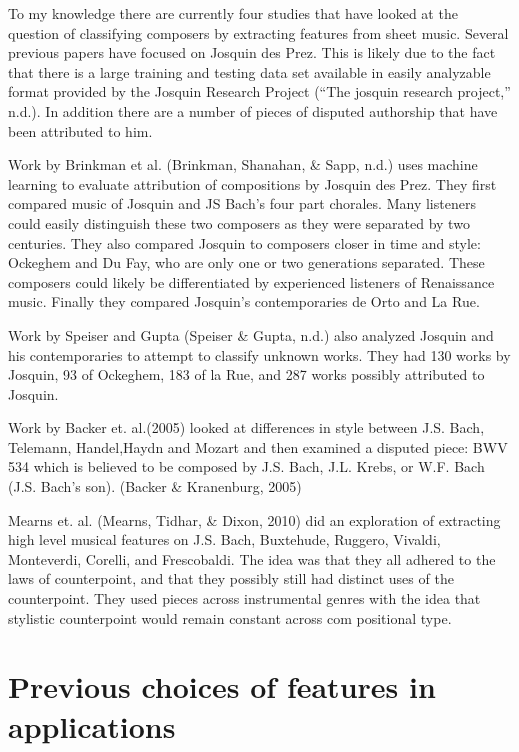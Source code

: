 \documentclass[12pt,twoside]{reedthesis}
\theoremstyle{definition}
\theoremstyle{definition}
\theoremstyle{definition}
\theoremstyle{remark}
\begin{document}
To my knowledge there are currently four studies that have looked at the
question of classifying composers by extracting features from sheet
music. Several previous papers have focused on Josquin des Prez. This is
likely due to the fact that there is a large training and testing data
set available in easily analyzable format provided by the Josquin
Research Project (``The josquin research project,'' n.d.). In addition
there are a number of pieces of disputed authorship that have been
attributed to him.

Work by Brinkman et al. (Brinkman, Shanahan, \& Sapp, n.d.) uses machine
learning to evaluate attribution of compositions by Josquin des Prez.
They first compared music of Josquin and JS Bach's four part chorales.
Many listeners could easily distinguish these two composers as they were
separated by two centuries. They also compared Josquin to composers
closer in time and style: Ockeghem and Du Fay, who are only one or two
generations separated. These composers could likely be differentiated by
experienced listeners of Renaissance music. Finally they compared
Josquin's contemporaries de Orto and La Rue.

Work by Speiser and Gupta (Speiser \& Gupta, n.d.) also analyzed Josquin
and his contemporaries to attempt to classify unknown works. They had
130 works by Josquin, 93 of Ockeghem, 183 of la Rue, and 287 works
possibly attributed to Josquin.

Work by Backer et. al.(2005) looked at differences in style between J.S.
Bach, Telemann, Handel,Haydn and Mozart and then examined a disputed
piece: BWV 534 which is believed to be composed by J.S. Bach, J.L.
Krebs, or W.F. Bach (J.S. Bach's son). (Backer \& Kranenburg, 2005)

Mearns et. al. (Mearns, Tidhar, \& Dixon, 2010) did an exploration of
extracting high level musical features on J.S. Bach, Buxtehude, Ruggero,
Vivaldi, Monteverdi, Corelli, and Frescobaldi. The idea was that they
all adhered to the laws of counterpoint, and that they possibly still
had distinct uses of the counterpoint. They used pieces across
instrumental genres with the idea that stylistic counterpoint would
remain constant across com positional type.

\section{Previous choices of features in
applications}\label{previous-choices-of-features-in-applications}
\end{document}
